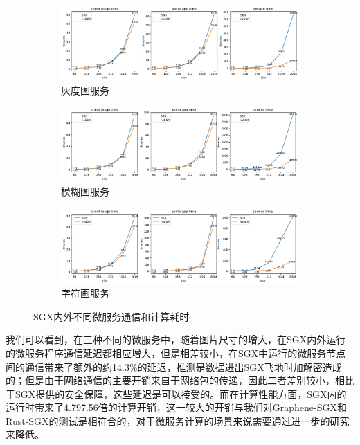 \begin{figure}[!ht]
    \centering
    \begin{subfigure}{0.96\textwidth}
        \centering
        \includegraphics[width=\textwidth]{figures/grayscale.pdf}
        \caption{灰度图服务}
    \end{subfigure}
    \begin{subfigure}{0.96\textwidth}
        \centering
        \includegraphics[width=\textwidth]{figures/blur.pdf}
        \caption{模糊图服务}
    \end{subfigure}
    \begin{subfigure}{0.96\textwidth}
        \centering
        \includegraphics[width=\textwidth]{figures/ascii.pdf}
        \caption{字符画服务}
    \end{subfigure}
    \caption{SGX内外不同微服务通信和计算耗时}
    \label{fig:evaluation}
\end{figure}

我们可以看到，在三种不同的微服务中，随着图片尺寸的增大，在SGX内外运行的微服务程序通信延迟都相应增大，但是相差较小，在SGX中运行的微服务节点间的通信带来了额外的约14.3\%的延迟，推测是数据进出SGX飞地时加解密造成的；但是由于网络通信的主要开销来自于网络包的传递，因此二者差别较小，相比于SGX提供的安全保障，这些延迟是可以接受的。而在计算性能方面，SGX内的运行时带来了4.79\~7.56倍的计算开销，这一较大的开销与我们对Graphene-SGX和Rust-SGX的测试是相符合的，对于微服务计算的场景来说需要通过进一步的研究来降低。


